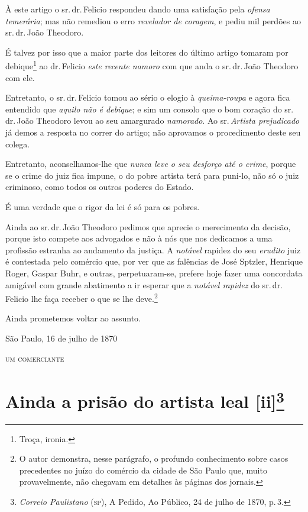 À este artigo o sr.\,dr.\,Felicio respondeu dando uma satisfação pela
\emph{ofensa temerária}; mas não remediou o erro \emph{revelador de
coragem}, e pediu mil perdões ao sr.\,dr.\,João Theodoro.

É talvez por isso que a maior parte dos leitores do último artigo
tomaram por debique\footnote{ Troça, ironia.} ao dr.\,Felicio \emph{este
recente namoro} com que anda o sr.\,dr.\,João Theodoro com ele.

Entretanto, o sr.\,dr.\,Felicio tomou ao sério o elogio à
\emph{queima-roupa} e agora fica entendido que \emph{aquilo não é
debique}; e sim um consolo que o bom coração do sr.\,dr.\,João Theodoro
levou ao seu amargurado \emph{namorado}. Ao sr.\,\emph{Artista
prejudicado} já demos a resposta no correr do artigo; não aprovamos o
procedimento deste seu colega.

Entretanto, aconselhamos-lhe que \emph{nunca leve o seu desforço até o
crime}, porque se o crime do juiz fica impune, o do pobre artista terá
para puni-lo, não só o juiz criminoso, como todos os outros poderes do
Estado.

É uma verdade que o rigor da lei é só para os pobres.

Ainda ao sr.\,dr.\,João Theodoro pedimos que aprecie o merecimento da
decisão, porque isto compete aos advogados e não à nós que nos dedicamos
a uma profissão estranha ao andamento da justiça. A \emph{notável}
rapidez do seu \emph{erudito} juiz é contestada pelo comércio que, por
ver que as falências de José Sptzler, Henrique Roger, Gaspar Buhr, e
outras, perpetuaram-se, prefere hoje fazer uma concordata amigável com
grande abatimento a ir esperar que a \emph{notável rapidez} do sr.\,dr.\,Felicio lhe faça receber o que se lhe deve.\footnote{ O autor
  demonstra, nesse parágrafo, o profundo conhecimento sobre casos
  precedentes no juízo do comércio da cidade de São Paulo que, muito
  provavelmente, não chegavam em detalhes às páginas dos jornais.}

Ainda prometemos voltar ao assunto.

\begin{flushright}
São Paulo, 16 de julho de 1870

\textsc{um comerciante}
\end{flushright}

\chapter{Ainda a prisão do artista leal {[}ii{]}\footnote{\emph{Correio Paulistano} (\textsc{sp}), A Pedido, Ao Público,
  24 de julho de 1870, p.\,3.}} %

